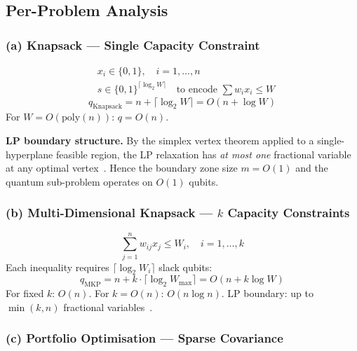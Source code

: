 \documentclass[11pt]{article}
\theoremstyle{remark}
\begin{document}
\subsection{Per-Problem Analysis}

\subsubsection*{(a) Knapsack --- Single Capacity Constraint}

\begin{align}
  &x_i \in \{0,1\}, \quad i = 1, \ldots, n \\
  &s \in \{0,1\}^{\lceil \log_2 W \rceil}
    \quad\text{to encode } \textstyle\sum w_i x_i \leq W
\end{align}
\begin{equation}
  \boxed{q_{\text{Knapsack}} = n + \lceil \log_2 W \rceil = O(n + \log W)}
\end{equation}
For $W = O(\mathrm{poly}(n))$: $q = O(n)$.

\textbf{LP boundary structure.} By the simplex vertex theorem applied to a
single-hyperplane feasible region, the LP relaxation has \emph{at most one}
fractional variable at any optimal vertex~\cite{dantzig1957,kellerer2004}.
Hence the boundary zone size $m = O(1)$ and the quantum sub-problem operates
on $O(1)$ qubits.

\subsubsection*{(b) Multi-Dimensional Knapsack --- $k$ Capacity Constraints}

\begin{equation}
  \sum_{j=1}^{n} w_{ij} x_j \leq W_i, \quad i = 1, \ldots, k
\end{equation}
Each inequality requires $\lceil \log_2 W_i \rceil$ slack qubits:
\begin{equation}
  q_{\text{MKP}} = n + k \cdot \lceil \log_2 W_{\max} \rceil = O(n + k \log W)
\end{equation}
For fixed $k$: $O(n)$. For $k = O(n)$: $O(n \log n)$.
LP boundary: up to $\min(k, n)$ fractional variables~\cite{schrijver1986}.

\subsubsection*{(c) Portfolio Optimisation --- Sparse Covariance}
\end{document}
